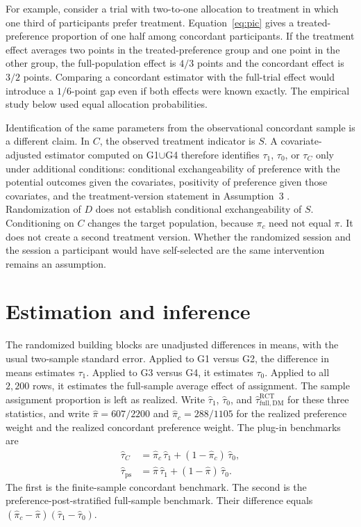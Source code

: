 \documentclass[twoside,11pt]{article}
\begin{document}
For example, consider a trial with two-to-one allocation to treatment in which one third of participants prefer treatment. Equation~\eqref{eq:pic} gives a treated-preference proportion of one half among concordant participants. If the treatment effect averages two points in the treated-preference group and one point in the other group, the full-population effect is $4/3$ points and the concordant effect is $3/2$ points. Comparing a concordant estimator with the full-trial effect would introduce a $1/6$-point gap even if both effects were known exactly. The empirical study below used equal allocation probabilities.

Identification of the same parameters from the observational concordant sample is a different claim. In $C$, the observed treatment indicator is $S$. A covariate-adjusted estimator computed on G1$\cup$G4 therefore identifies $\tau_1$, $\tau_0$, or $\tau_C$ only under additional conditions: conditional exchangeability of preference with the potential outcomes given the covariates, positivity of preference given those covariates, and the treatment-version statement in Assumption~3 \citep{imbens2004}. Randomization of $D$ does not establish conditional exchangeability of $S$. Conditioning on $C$ changes the target population, because $\pi_c$ need not equal $\pi$. It does not create a second treatment version. Whether the randomized session and the session a participant would have self-selected are the same intervention remains an assumption.

\section{Estimation and inference}
\label{sec:estimation}

The randomized building blocks are unadjusted differences in means, with the usual two-sample standard error. Applied to G1 versus G2, the difference in means estimates $\tau_1$. Applied to G3 versus G4, it estimates $\tau_0$. Applied to all $2{,}200$ rows, it estimates the full-sample average effect of assignment. The sample assignment proportion is left as realized. Write $\widehat\tau_1$, $\widehat\tau_0$, and $\widehat\tau^{\mathrm{RCT}}_{\mathrm{full,DM}}$ for these three statistics, and write $\widehat\pi=607/2200$ and $\widehat\pi_c=288/1105$ for the realized preference weight and the realized concordant preference weight. The plug-in benchmarks are
\begin{align*}
\widehat\tau_C
&=
\widehat\pi_c\,\widehat\tau_1+(1-\widehat\pi_c)\,\widehat\tau_0,\\
\widehat\tau_{\mathrm{ps}}
&=
\widehat\pi\,\widehat\tau_1+(1-\widehat\pi)\,\widehat\tau_0.
\end{align*}
The first is the finite-sample concordant benchmark. The second is the preference-post-stratified full-sample benchmark. Their difference equals $(\widehat\pi_c-\widehat\pi)(\widehat\tau_1-\widehat\tau_0)$.
\end{document}
